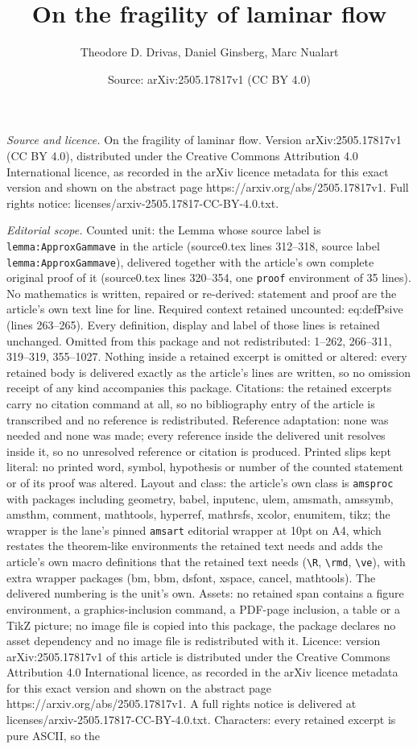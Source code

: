 \documentclass[10pt,a4paper]{amsart}
\title[On the fragility of laminar flow]{On the fragility of laminar flow}
\author{Theodore D. Drivas, Daniel Ginsberg, Marc Nualart}
\date{Source: arXiv:2505.17817v1 (CC BY 4.0)}
\begin{document}
\maketitle

\noindent\emph{Source and licence.} On the fragility of laminar flow. Version arXiv:2505.17817v1 (CC BY 4.0), distributed under the Creative Commons Attribution 4.0 International licence, as recorded in the arXiv licence metadata for this exact version and shown on the abstract page https://arxiv.org/abs/2505.17817v1. Full rights notice: licenses/arxiv-2505.17817-CC-BY-4.0.txt.\par\smallskip

\noindent\textit{Editorial scope.} Counted unit: the Lemma whose source label is \texttt{lemma:ApproxGammave} in the article (source0.tex lines 312--318, source label \texttt{lemma:ApproxGammave}), delivered together with the article's own complete original proof of it (source0.tex lines 320--354, one \texttt{proof} environment of 35 lines). No mathematics is written, repaired or re-derived: statement and proof are the article's own text line for line. Required context retained uncounted: eq:defPsive (lines 263--265). Every definition, display and label of those lines is retained unchanged. Omitted from this package and not redistributed: 1--262, 266--311, 319--319, 355--1027. Nothing inside a retained excerpt is omitted or altered: every retained body is delivered exactly as the article's lines are written, so no omission receipt of any kind accompanies this package. Citations: the retained excerpts carry no citation command at all, so no bibliography entry of the article is transcribed and no reference is redistributed. Reference adaptation: none was needed and none was made; every reference inside the delivered unit resolves inside it, so no unresolved reference or citation is produced. Printed slips kept literal: no printed word, symbol, hypothesis or number of the counted statement or of its proof was altered. Layout and class: the article's own class is \texttt{amsproc} with packages including geometry, babel, inputenc, ulem, amsmath, amssymb, amsthm, comment, mathtools, hyperref, mathrsfs, xcolor, enumitem, tikz; the wrapper is the lane's pinned \texttt{amsart} editorial wrapper at 10pt on A4, which restates the theorem-like environments the retained text needs and adds the article's own macro definitions that the retained text needs (\texttt{\textbackslash R}, \texttt{\textbackslash rmd}, \texttt{\textbackslash ve}), with extra wrapper packages (bm, bbm, dsfont, xspace, cancel, mathtools). The delivered numbering is the unit's own. Assets: no retained span contains a figure environment, a graphics-inclusion command, a PDF-page inclusion, a table or a TikZ picture; no image file is copied into this package, the package declares no asset dependency and no image file is redistributed with it. Licence: version arXiv:2505.17817v1 of this article is distributed under the Creative Commons Attribution 4.0 International licence, as recorded in the arXiv licence metadata for this exact version and shown on the abstract page https://arxiv.org/abs/2505.17817v1. A full rights notice is delivered at licenses/arxiv-2505.17817-CC-BY-4.0.txt. Characters: every retained excerpt is pure ASCII, so the 
\end{document}
